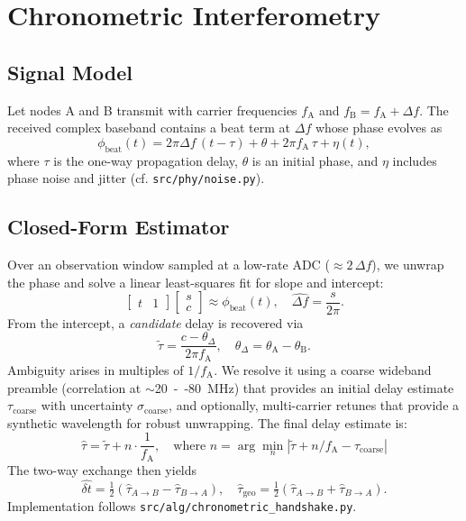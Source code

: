 \documentclass[10pt]{article}
\begin{document}
\section{Chronometric Interferometry}
\subsection{Signal Model}
Let nodes A and B transmit with carrier frequencies \(f_\mathrm{A}\) and \(f_\mathrm{B}=f_\mathrm{A}+\Delta f\). The received complex baseband contains a beat term at \(\Delta f\) whose phase evolves as
\begin{equation}
\label{eq:beatphase}
\phi_\mathrm{beat}(t) = 2\pi \Delta f\,(t-\tau) + \theta + 2\pi f_\mathrm{A}\,\tau + \eta(t),
\end{equation}
where \(\tau\) is the one-way propagation delay, \(\theta\) is an initial phase, and \(\eta\) includes phase noise and jitter (cf. \verb|src/phy/noise.py|).

\subsection{Closed-Form Estimator}
Over an observation window sampled at a low-rate ADC (\(\approx 2\,\Delta f\)), we unwrap the phase and solve a linear least-squares fit for slope and intercept:
\begin{equation}
\label{eq:ls}
\begin{bmatrix}t & 1\end{bmatrix} \begin{bmatrix}s \\ c\end{bmatrix} \approx \phi_\mathrm{beat}(t), \quad \hat{\Delta f} = \frac{s}{2\pi}.
\end{equation}
From the intercept, a \emph{candidate} delay is recovered via
\begin{equation}
\label{eq:tau-candidate}
\tilde{\tau} = \frac{c - \theta_\Delta}{2\pi f_\mathrm{A}}, \quad \theta_\Delta = \theta_\mathrm{A} - \theta_\mathrm{B}.
\end{equation}
Ambiguity arises in multiples of $1/f_\mathrm{A}$. We resolve it using a coarse wideband preamble (correlation at $\sim$\SI{20}{--}\SI{80}{MHz}) that provides an initial delay estimate $\tau_\mathrm{coarse}$ with uncertainty $\sigma_\mathrm{coarse}$, and optionally, multi-carrier retunes that provide a synthetic wavelength for robust unwrapping. The final delay estimate is:
\begin{equation}
\hat{\tau} = \tilde{\tau} + n\cdot\frac{1}{f_\mathrm{A}}, \quad \text{where } n = \arg\min_n |\tilde{\tau} + n/f_\mathrm{A} - \tau_\mathrm{coarse}|
\end{equation}
The two-way exchange then yields
\begin{equation}
\hat{\delta t} = \tfrac{1}{2}(\hat{\tau}_{A\rightarrow B} - \hat{\tau}_{B\rightarrow A}), \quad \hat{\tau}_\mathrm{geo} = \tfrac{1}{2}(\hat{\tau}_{A\rightarrow B} + \hat{\tau}_{B\rightarrow A}).
\end{equation}
Implementation follows \verb|src/alg/chronometric_handshake.py|.
\end{document}
